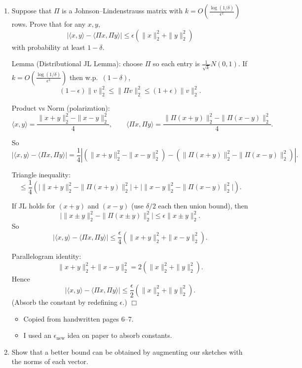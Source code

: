 \documentclass[10pt]{article}
\newcommand{\spara}[1]{\vspace{.5em}\noindent {\large\sffamily\textcolor{nyuOfficialPurple}{#1}}}
\begin{document}
\begin{enumerate}[label=\arabic*.]

\item Suppose that $\Pi$ is a Johnson--Lindenstrauss matrix with $k = O\!\left(\frac{\log(1/\delta)}{\epsilon^2}\right)$ rows. Prove that for any $x,y$,
\[
\big|\langle x,y\rangle - \langle \Pi x,\Pi y\rangle\big|
\leq \epsilon \left(\|x\|_2^2 + \|y\|_2^2\right)
\]
with probability at least $1-\delta$.

\spara{Pr. 4.1}

Lemma (Distributional JL Lemma): choose $\Pi$ so each entry is $\frac{1}{\sqrt{k}}N(0,1)$.
If $k=O\!\left(\frac{\log(1/\delta)}{\epsilon^2}\right)$ then w.p.\ $(1-\delta)$,
\[
(1-\epsilon)\|v\|_2^2 \le \|\Pi v\|_2^2 \le (1+\epsilon)\|v\|_2^2.
\]

Product vs Norm (polarization):
\[
\langle x,y\rangle = \frac{\|x+y\|_2^2-\|x-y\|_2^2}{4},
\qquad
\langle \Pi x,\Pi y\rangle = \frac{\|\Pi(x+y)\|_2^2-\|\Pi(x-y)\|_2^2}{4}.
\]

So
\[
|\langle x,y\rangle - \langle \Pi x,\Pi y\rangle|
=
\frac{1}{4}\left|
(\|x+y\|_2^2-\|x-y\|_2^2)
-
(\|\Pi(x+y)\|_2^2-\|\Pi(x-y)\|_2^2)
\right|.
\]

Triangle inequality:
\[
\le
\frac{1}{4}\left(
\big|\|x+y\|_2^2-\|\Pi(x+y)\|_2^2\big|
+
\big|\|x-y\|_2^2-\|\Pi(x-y)\|_2^2\big|
\right).
\]

If JL holds for $(x+y)$ and $(x-y)$ (use $\delta/2$ each then union bound), then
\[
\big|\|x\pm y\|_2^2-\|\Pi(x\pm y)\|_2^2\big|\le \epsilon\|x\pm y\|_2^2.
\]
So
\[
|\langle x,y\rangle - \langle \Pi x,\Pi y\rangle|
\le
\frac{\epsilon}{4}\left(\|x+y\|_2^2+\|x-y\|_2^2\right).
\]

Parallelogram identity:
\[
\|x+y\|_2^2+\|x-y\|_2^2 = 2(\|x\|_2^2+\|y\|_2^2).
\]
Hence
\[
|\langle x,y\rangle - \langle \Pi x,\Pi y\rangle|
\le
\frac{\epsilon}{2}(\|x\|_2^2+\|y\|_2^2).
\]
(Absorb the constant by redefining $\epsilon$.) \(\Box\)

\spara{Notes (Pr. 4.1)}
\begin{itemize}
\item Copied from handwritten pages 6--7.
\item I used an $\epsilon_{\text{new}}$ idea on paper to absorb constants.
\end{itemize}


\item Show that a better bound can be obtained by augmenting our sketches with the norms of each vector.

\spara{Pr. 4.2}


\end{enumerate}
\end{document}

